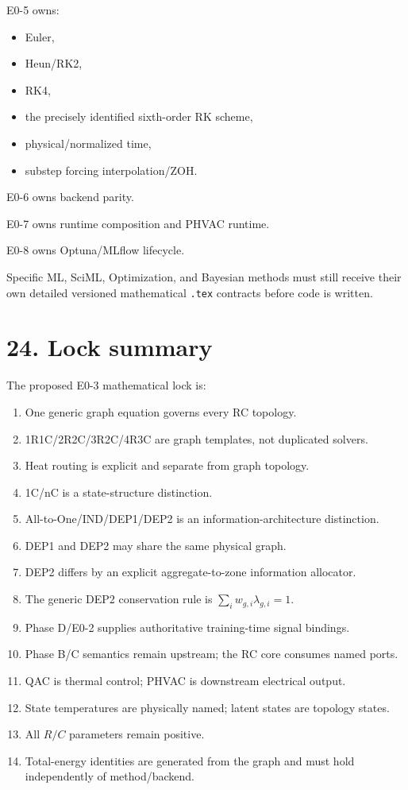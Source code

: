 \documentclass[11pt]{article}
\begin{document}
E0-5 owns:
\begin{itemize}
    \item Euler,
    \item Heun/RK2,
    \item RK4,
    \item the precisely identified sixth-order RK scheme,
    \item physical/normalized time,
    \item substep forcing interpolation/ZOH.
\end{itemize}

E0-6 owns backend parity.

E0-7 owns runtime composition and PHVAC runtime.

E0-8 owns Optuna/MLflow lifecycle.

Specific ML, SciML, Optimization, and Bayesian methods must still receive
their own detailed versioned mathematical \texttt{.tex} contracts before code
is written.

\section*{24. Lock summary}

The proposed E0-3 mathematical lock is:

\begin{enumerate}
    \item One generic graph equation governs every RC topology.
    \item 1R1C/2R2C/3R2C/4R3C are graph templates, not duplicated solvers.
    \item Heat routing is explicit and separate from graph topology.
    \item 1C/nC is a state-structure distinction.
    \item All-to-One/IND/DEP1/DEP2 is an information-architecture distinction.
    \item DEP1 and DEP2 may share the same physical graph.
    \item DEP2 differs by an explicit aggregate-to-zone information allocator.
    \item The generic DEP2 conservation rule is
          $\sum_i w_{g,i}\lambda_{g,i}=1$.
    \item Phase D/E0-2 supplies authoritative training-time signal bindings.
    \item Phase B/C semantics remain upstream; the RC core consumes named ports.
    \item QAC is thermal control; PHVAC is downstream electrical output.
    \item State temperatures are physically named; latent states are topology
          states.
    \item All $R/C$ parameters remain positive.
    \item Total-energy identities are generated from the graph and must hold
          independently of method/backend.
\end{enumerate}
\end{document}

